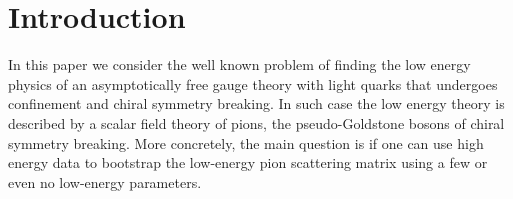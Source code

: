 \documentclass[12pt,letterpaper]{article}
\begin{document}
 



\section{Introduction}

 In this paper we consider the well known problem of finding the low energy physics of an asymptotically free gauge theory with light quarks that undergoes confinement and chiral symmetry breaking. In such case the low energy theory is described by a scalar field theory of pions, the pseudo-Goldstone bosons of chiral symmetry breaking. More concretely, the main question is if one can use high energy data to bootstrap the low-energy pion scattering matrix using a few or even no low-energy parameters.  
 
\end{document}
